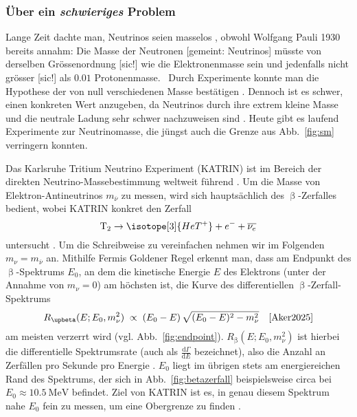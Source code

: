 \documentclass[a4paper,12pt]{article}
\newcommand{\figref}[1]{Abb.~\ref{#1}}
\begin{document}
\subsubsection{Über ein \emph{schwieriges} Problem} \label{sssec:222}
Lange Zeit dachte man, Neutrinos seien masselos \cite[26]{Athar2020}, obwohl Wolfgang Pauli 1930 bereits annahm: \glqq Die Masse der Neutronen [gemeint: Neutrinos] müsste von derselben Grössenordnung [sic!] wie die Elektronenmasse sein und jedenfalls nicht grösser [sic!] als $\num{0,01}$ Protonenmasse.\grqq \ \cite[2]{Pauli} Durch Experimente konnte man die Hypothese der von null verschiedenen Masse bestätigen \cite[300]{Zyla2020}. Dennoch ist es schwer, einen konkreten Wert anzugeben, da Neutrinos durch ihre extrem kleine Masse und die neutrale Ladung sehr schwer nachzuweisen sind \cite{Dolan2025}. Heute gibt es laufend Experimente zur Neutrinomasse, die jüngst auch die Grenze aus \figref{fig:sm} verringern konnten. \par 
Das Karlsruhe Tritium Neutrino Experiment (KATRIN) ist im Bereich der direkten Neutrino-Massebestimmung weltweit führend \cite[180]{Aker2025}. Um die Masse von Elektron-Antineutrinos $m_{\overline{\nu}}$ zu messen, wird sich hauptsächlich des $\upbeta$-Zerfalles bedient, wobei KATRIN konkret den Zerfall
\begin{equation}
\mathrm{T_2}\rightarrow \isotope[3]{HeT^+} + e^-+\overline{\nu_e}
\label{eq:tritzerfall}
\end{equation}
untersucht \cite[072004-2]{Aker2022}. Um die Schreibweise zu vereinfachen nehmen wir im Folgenden $m_{\nu}=m_{\overline{\nu}}$ an. Mithilfe Fermis Goldener Regel \cite[2]{Kleesiek2019} erkennt man, dass am Endpunkt des $\upbeta$-Spektrums $E_0$, an dem die kinetische Energie $E$ des Elektrons (unter der Annahme von $m_\nu=0$) am höchsten ist, die Kurve des differentiellen $\upbeta$-Zerfall-Spektrums 
\begin{equation}
R_{\upbeta}(E;E_0,m_\nu^2)\;\propto\;(E_0 - E)\,\sqrt{(E_0 - E)^2 - m_\nu^2} \hspace{1em}\text{\cite[180]{Aker2025}}
\label{eq:diffspec}
\end{equation}
am meisten verzerrt wird (vgl. \figref{fig:endpoint}). $R_{\upbeta}(E;E_0,m_\nu^2)$ ist hierbei die differentielle Spektrumsrate (auch als $\frac{\mathrm{d}\Gamma}{\mathrm{d}E}$ bezeichnet), also die Anzahl an Zerfällen pro Sekunde pro Energie \cite[2--3]{Kleesiek2019}. $E_0$ liegt im übrigen stets am energiereichen Rand des Spektrums, der sich in \figref{fig:betazerfall} beispielsweise circa bei $E_0\approx \qty{10,5}{\mega\electronvolt}$ befindet. Ziel von KATRIN ist es, in genau diesem Spektrum nahe $E_0$ fein zu messen, um eine Obergrenze zu finden \cite[180]{Aker2025}.
\end{document}
